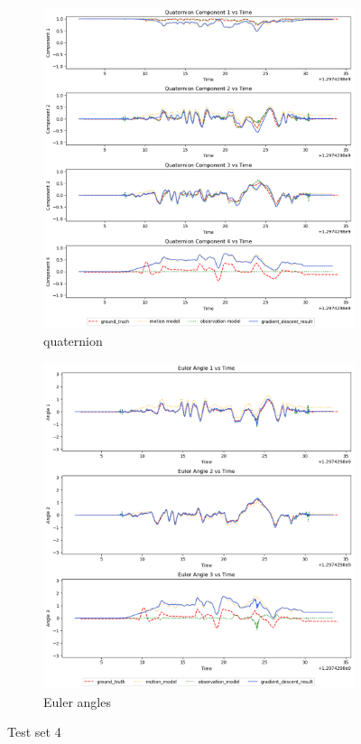 \documentclass[conference]{IEEEtran}
\begin{document}
\begin{figure}[h]
    \centering
    \begin{subfigure}{0.4\textwidth}
        \includegraphics[width=\linewidth]{../img/4_qt.png}
        \caption{quaternion}
    \end{subfigure}
    \hfill
    \begin{subfigure}{0.4\textwidth}
        \includegraphics[width=\linewidth]{../img/4_ea.png}
        \caption{Euler angles}
    \end{subfigure}
    \caption{Test set 4}
    \label{fig:set4}
\end{figure}
\end{document}
